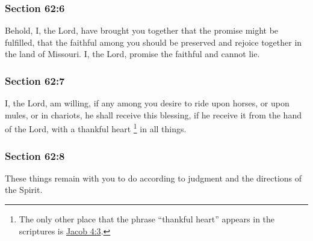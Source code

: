 	\subsubsection{Section 62:6} %
		\label{DC62-6}

		Behold, I, the Lord, have brought you together that the promise might be fulfilled, that the faithful among you should be preserved and rejoice together in the land of Missouri.  I, the Lord, promise the faithful and cannot lie.


	\subsubsection{Section 62:7} %
		\label{DC62-7}

		I, the Lord, am willing, if any among you desire to ride upon horses, or upon mules, or in chariots, he shall receive this blessing, if he receive it from the hand of the Lord, with a thankful heart%
			\footnote{%
				The only other place that the phrase ``thankful heart'' appears in the scriptures is \hyperref[JACOB-4-3]{Jacob 4:3}.
				}
		in all things.


	\subsubsection{Section 62:8} %
		\label{DC62-8}

		These things remain with you to do according to judgment and the directions of the Spirit.

